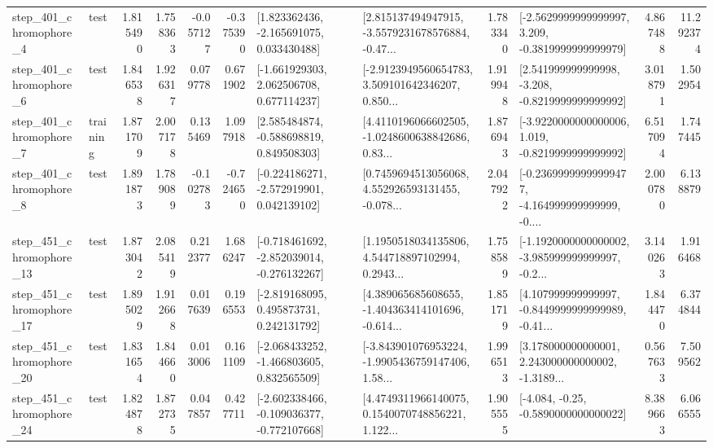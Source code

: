 \begin{tabular}{llrrrrllrlrr}
   step\_401\_chromophore\_4 &      test &      1.815490 &    1.758363 &     -0.057127 & -0.375390 &    [1.823362436, -2.165691075, 0.033430488] &  [2.815137494947915, -3.5579231678576884, -0.47... &       1.783340 &  [-2.5629999999999997, 3.209, -0.3819999999999979] &            4.867488 &         11.292374 \\
   step\_401\_chromophore\_6 &      test &      1.846538 &    1.926317 &      0.079778 &  0.671902 &    [-1.661929303, 2.062506708, 0.677114237] &  [-2.9123949560654783, 3.509101642346207, 0.850... &       1.919948 &   [2.541999999999998, -3.208, -0.8219999999999992] &            3.018791 &          1.502954 \\
   step\_401\_chromophore\_7 &  training &      1.871709 &    2.007178 &      0.135469 &  1.097918 &    [2.585484874, -0.588698819, 0.849508303] &  [4.4110196066602505, -1.0248600638842686, 0.83... &       1.876943 &  [-3.9220000000000006, 1.019, -0.8219999999999992] &            6.517094 &          1.747445 \\
   step\_401\_chromophore\_8 &      test &      1.891873 &    1.789089 &     -0.102783 & -0.724650 &   [-0.224186271, -2.572919901, 0.042139102] &  [0.7459694513056068, 4.552926593131455, -0.078... &       2.047922 &  [-0.23699999999999477, -4.164999999999999, -0.... &            2.000780 &          6.138879 \\
  step\_451\_chromophore\_13 &      test &      1.873042 &    2.085419 &      0.212377 &  1.686247 &  [-0.718461692, -2.852039014, -0.276132267] &  [1.1950518034135806, 4.544718897102994, 0.2943... &       1.758589 &  [-1.1920000000000002, -3.985999999999997, -0.2... &            3.140263 &          1.916468 \\
  step\_451\_chromophore\_17 &      test &      1.895029 &    1.912668 &      0.017639 &  0.196553 &    [-2.819168095, 0.495873731, 0.242131792] &  [4.389065685608655, -1.404363414101696, -0.614... &       1.851719 &  [4.107999999999997, -0.8449999999999989, -0.41... &            1.844470 &          6.374844 \\
  step\_451\_chromophore\_20 &      test &      1.831654 &    1.844660 &      0.013006 &  0.161109 &   [-2.068433252, -1.466803605, 0.832565509] &  [-3.843901076953224, -1.9905436759147406, 1.58... &       1.996513 &  [3.178000000000001, 2.243000000000002, -1.3189... &            0.567633 &          7.509562 \\
  step\_451\_chromophore\_24 &      test &      1.824878 &    1.872735 &      0.047857 &  0.427711 &  [-2.602338466, -0.109036377, -0.772107668] &  [4.4749311966140075, 0.1540070748856221, 1.122... &       1.905555 &               [-4.084, -0.25, -0.5890000000000022] &            8.389663 &          6.066555 \\

\end{tabular}
